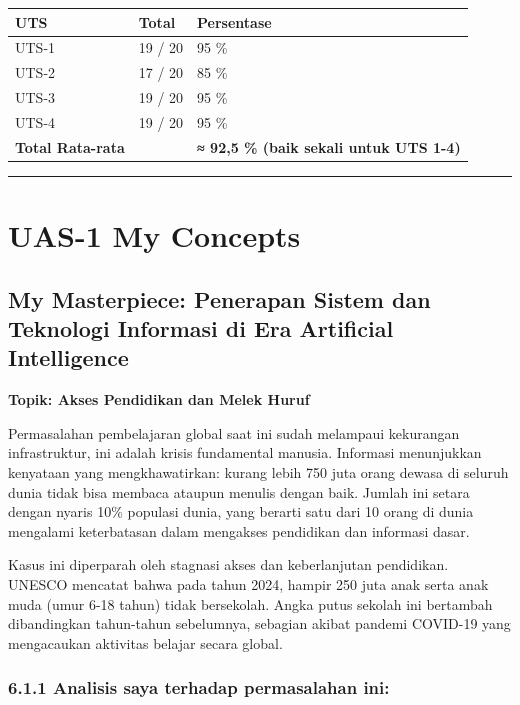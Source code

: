 \documentclass[
  letterpaper,
  DIV=11,
  numbers=noendperiod]{scrreprt}
\begin{document}
\begin{longtable}[]{@{}lll@{}}
\toprule\noalign{}
UTS & Total & Persentase \\
\midrule\noalign{}
\endhead
\bottomrule\noalign{}
\endlastfoot
UTS-1 & 19 / 20 & 95 \% \\
UTS-2 & 17 / 20 & 85 \% \\
UTS-3 & 19 / 20 & 95 \% \\
UTS-4 & 19 / 20 & 95 \% \\
\textbf{Total Rata-rata } & & \textbf{≈ 92,5 \% (baik sekali untuk UTS
1-4)} \\
\end{longtable}

\begin{center}\rule{0.5\linewidth}{0.5pt}\end{center}


\chapter{UAS-1 My Concepts}\label{uas-1-my-concepts}

\section{My Masterpiece: Penerapan Sistem dan Teknologi Informasi di Era
Artificial
Intelligence}\label{my-masterpiece-penerapan-sistem-dan-teknologi-informasi-di-era-artificial-intelligence}

\textbf{Topik: Akses Pendidikan dan Melek Huruf}

Permasalahan pembelajaran global saat ini sudah melampaui kekurangan
infrastruktur, ini adalah krisis fundamental manusia. Informasi
menunjukkan kenyataan yang mengkhawatirkan: kurang lebih 750 juta orang
dewasa di seluruh dunia tidak bisa membaca ataupun menulis dengan baik.
Jumlah ini setara dengan nyaris 10\% populasi dunia, yang berarti satu
dari 10 orang di dunia mengalami keterbatasan dalam mengakses pendidikan
dan informasi dasar.

Kasus ini diperparah oleh stagnasi akses dan keberlanjutan pendidikan.
UNESCO mencatat bahwa pada tahun 2024, hampir 250 juta anak serta anak
muda (umur 6-18 tahun) tidak bersekolah. Angka putus sekolah ini
bertambah dibandingkan tahun-tahun sebelumnya, sebagian akibat pandemi
COVID-19 yang mengacaukan aktivitas belajar secara global.

\subsection{6.1.1 Analisis saya terhadap permasalahan
ini:}\label{analisis-saya-terhadap-permasalahan-ini}
\end{document}
